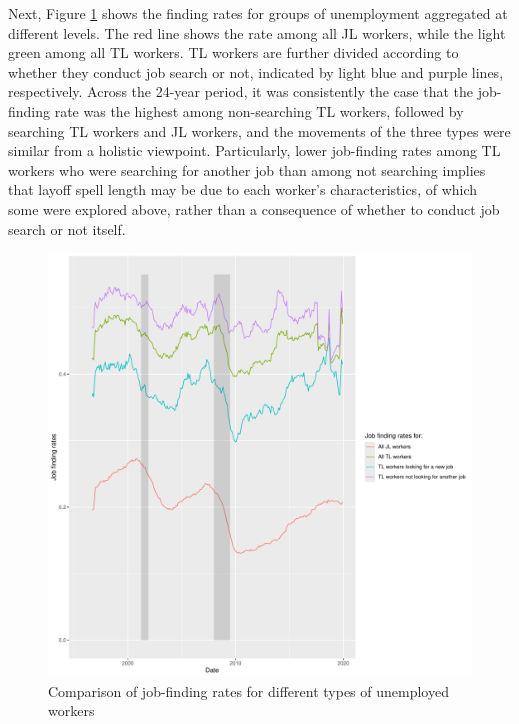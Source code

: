 \documentclass[a4paper, 11pt, tikz]{article}
\begin{document}
Next, Figure \ref{finding_rates_JLTL} shows the finding rates for groups of unemployment aggregated at different levels.
The red line shows the rate among all JL workers, while the light green among all TL workers.
TL workers are further divided according to whether they conduct job search or not, indicated by light blue and purple lines, respectively.
Across the 24-year period, it was consistently the case that the job-finding rate was the highest among non-searching TL workers, followed by searching TL workers and JL workers, and the movements of the three types were similar from a holistic viewpoint.
Particularly, lower job-finding rates among TL workers who were searching for another job than among not searching implies that layoff spell length may be due to each worker's characteristics, of which some were explored above, rather than a consequence of whether to conduct job search or not itself.

\begin{figure}
  \centering
  \includegraphics[width=150mm]{finding_rates_JLTL.pdf}
  \caption{Comparison of job-finding rates for different types of unemployed workers}
  \label{finding_rates_JLTL}
\end{figure}
\end{document}
